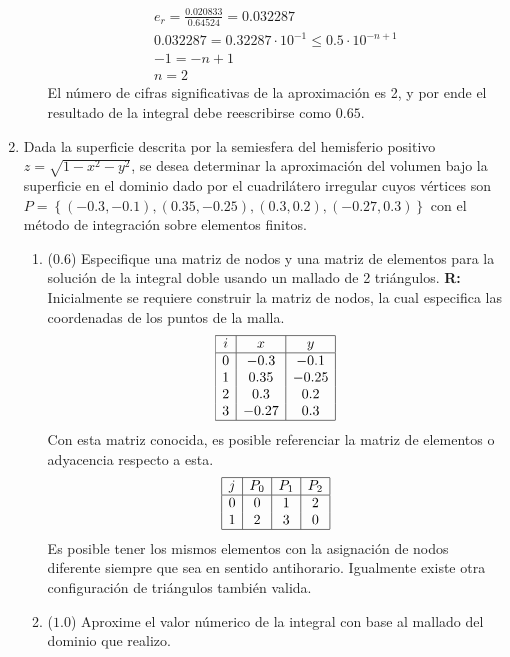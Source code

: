 \documentclass[12pt]{article}
\begin{document}
\begin{enumerate}[leftmargin=*,widest=9]
\begin{enumerate}[label=\alph*]
\begin{eqnarray*}
e_r = \frac{0.020833}{0.64524} = 0.032287\\
0.032287  = 0.32287\cdot 10^{-1} \leq 0.5 \cdot 10^{-n+1}\\
-1 = -n + 1\\
n = 2
\end{eqnarray*}
El número de cifras significativas de la aproximación es 2, y por ende el resultado de la integral debe reescribirse como \(0.65\).
    \end{enumerate}
    \item Dada la superficie descrita por la semiesfera del hemisferio positivo \(z=\sqrt{1 - x^2 - y^2}\), se desea determinar la aproximación del volumen bajo la superficie en el dominio dado por el cuadrilátero irregular cuyos vértices son
    \(
    P = \left\lbrace (-0.3, -0.1), (0.35, -0.25), (0.3, 0.2), (-0.27, 0.3)\right\rbrace
    \)
    con el método de integración sobre elementos finitos.
    \begin{enumerate}[label=\alph*]
    \item (\(0.6\)) Especifique una matriz de nodos y una matriz de elementos para la solución de la integral doble usando un mallado de 2 triángulos.
	   \textbf{R:}
Inicialmente se requiere construir la matriz de nodos, la cual especifica las coordenadas de los puntos de la malla.
     \[
     \begin{array}{|c|c|c|}
     \hline
     i & x & y\\
     \hline
     0 & -0.3 & -0.1\\
     1 & 0.35 & -0.25\\
     2 & 0.3 & 0.2\\
     3 & -0.27 & 0.3\\
     \hline
     \end{array}
     \]
Con esta matriz conocida, es posible referenciar la matriz de elementos o adyacencia respecto a esta.
\[
\begin{array}{|c|c|c|c|}
\hline
j & P_0 & P_1 & P_2 \\
\hline
0 & 0 & 1 & 2\\
1 & 2 & 3 & 0\\
\hline
\end{array}
\]
Es posible tener los mismos elementos con la asignación de nodos diferente siempre que sea en sentido antihorario. Igualmente existe otra configuración de triángulos también valida.
    \item (\(1.0\)) Aproxime el valor númerico de la integral con base al mallado del dominio que realizo.

\end{enumerate}
\end{enumerate}
\end{document}
